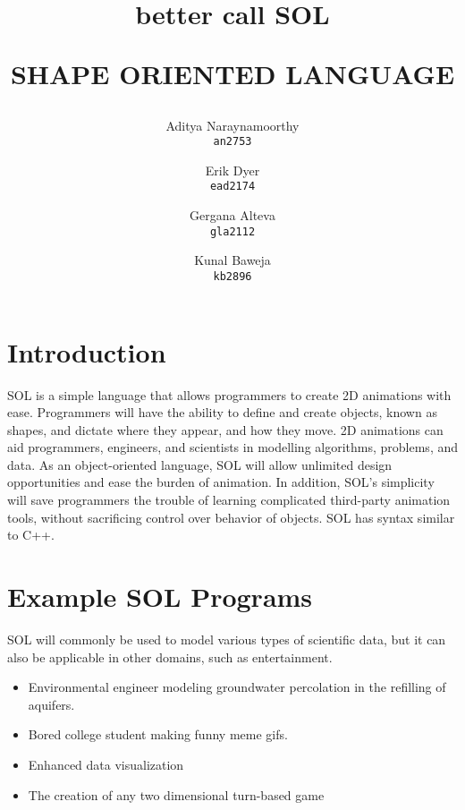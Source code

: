 \documentclass[letterpaper,12pt]{article}
\begin{document}

\title{{\small better call} {\Huge \textbf{SOL}}\\
    \begin{center}{SHAPE ORIENTED LANGUAGE}\end{center}
}


\author{Aditya Naraynamoorthy\\
    \texttt{an2753}
    \and
    Erik Dyer\\
    \texttt{ead2174}
    \and
    Gergana Alteva\\
    \texttt{gla2112}
    \and
    Kunal Baweja\\
    \texttt{kb2896}}

\maketitle

\section*{Introduction}
SOL is a simple language that allows programmers to create 2D animations with ease. Programmers will have the ability to define and create objects, known as shapes, and dictate where they appear, and how they move. 2D animations can aid programmers, engineers, and scientists in modelling algorithms, problems, and data. As an object-oriented language, SOL will allow unlimited design opportunities and ease the burden of animation. In addition, SOL’s simplicity will save programmers the trouble of learning complicated third-party animation tools, without sacrificing control over behavior of objects. SOL has syntax similar to C++.
\par


\section*{Example SOL Programs}

SOL will commonly be used to model various types of scientific data, but it can also be applicable in other domains, such as entertainment.

\begin{itemize}
\itemsep0em 
\item Environmental engineer modeling groundwater percolation in the refilling of aquifers.
\item Bored college student making funny meme gifs.
\item Enhanced data visualization
\item The creation of any two dimensional turn-based game
\end{itemize}
\end{document}
